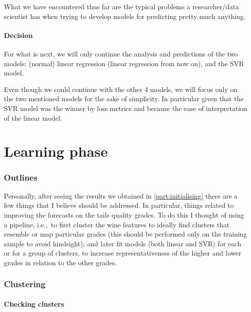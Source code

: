 \documentclass[11pt]{article}
\begin{document}
What we have encountered thus far are the typical problems a researcher/data scientist has when trying to develop models
for predicting pretty much anything.

\subsection{Decision}\label{subsec:decision}

For what is next, we will only continue the analysis and predictions of the two models: (normal) linear regression
(linear regression from now on), and the SVR model.

Even though we could continue with the other 4 models, we will focus only on the two mentioned models for the sake of
simplicity.
In particular given that the SVR model was the winner by loss metrics and because the ease of interpretation of the
linear model.



\part{Learning phase} \label{part:learning}

\section{Outlines}\label{sec:outlines}

Personally, after seeing the results we obtained in \cref{part:initialising} there are a few things that I believe should
be addressed.
In particular, things related to improving the forecasts on the tails quality grades.
To do this I thought of using a pipeline, i.e.,\ to first cluster the wine features to ideally find clusters
that resemble or map particular grades (this should be performed only on the training sample to avoid hindsight);
and later fit models (both linear and SVR) for each or for a group of clusters, to increase representativeness of the
higher and lower grades in relation to the other grades.


\section{Clustering}\label{sec:clustering}

\subsection{Checking clusters}\label{subsec:checking-clusters}
\end{document}
